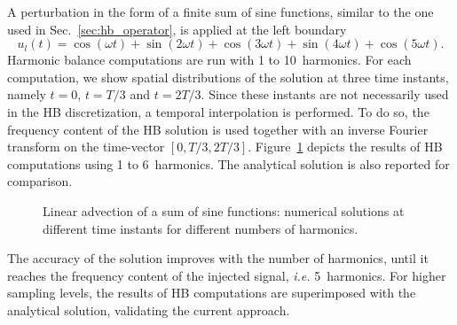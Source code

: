 A perturbation 
in the form of a finite sum of sine functions, similar to the one used
in Sec.~\ref{sec:hb_operator},
is applied at the left boundary
\begin{equation}
    u_l(t) = \cos(\omega t) + \sin(2 \omega t) +
    \cos(3 \omega t) + \sin(4 \omega t) + \cos(5 \omega t).
    \label{eq:sum_injected_fct}
\end{equation}
Harmonic balance computations are run with 1 to 10~harmonics.
For each computation, we show spatial distributions of the solution
at three time instants, namely $t=0$, $t=T/3$ and $t=2T/3$.
Since these instants are not necessarily used in the HB discretization,
a temporal interpolation is performed.
To do so, the frequency content of the HB solution is used
together with an inverse Fourier transform on the time-vector
$[0, T/3, 2T/3]$.
Figure~\ref{fig:inj_sine_results} depicts the results of HB computations
using 1 to 6~harmonics. The analytical solution is also reported for comparison.

\begin{figure}[htp]
  \centering
  \caption{Linear advection of a sum of sine functions: 
  numerical solutions at different time instants for different numbers of harmonics.}
  \label{fig:inj_sine_results}
\end{figure}

The accuracy of the solution 
improves with the number of harmonics,
until it reaches the frequency content
of the injected signal, \emph{i.e.} 5~harmonics.
For higher sampling levels, the results of HB computations are
superimposed with the analytical solution, validating the current approach.

